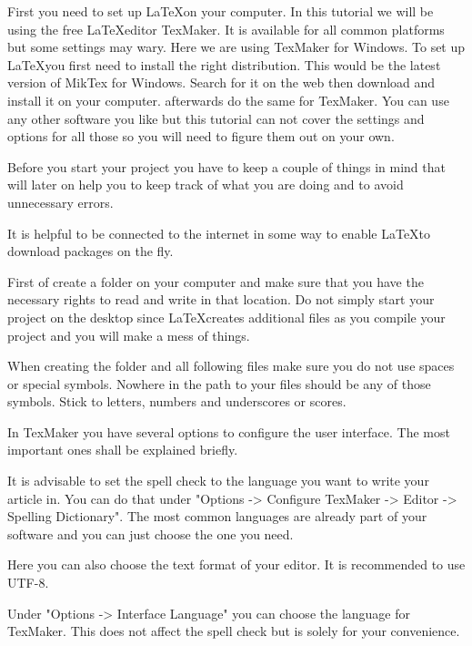 \documentclass[justified]{tufte-book} %
\begin{document}
First you need to set up \LaTeX on your computer. In this tutorial we will be using the free \LaTeX editor TexMaker. It is available for all common platforms but some settings may wary. Here we are using TexMaker for Windows. To set up \LaTeX you first need to install the right distribution. This would be the latest version of MikTex for Windows. Search for it on the web then download and install it on your computer. afterwards do the same for TexMaker. You can use any other software you like but this tutorial can not cover the settings and options for all those so you will need to figure them out on your own.
  
Before you start your project you have to keep a couple of things in mind that will later on help you to keep track of what you are doing and to avoid unnecessary errors.
 
It is helpful to be connected to the internet in some way to enable \LaTeX to download packages on the fly.

First of create a folder on your computer and make sure that you have the necessary rights to read and write in that location. Do not simply start your project on the desktop since \LaTeX creates additional files as you compile your project and you will make a mess of things.
 
When creating the folder and all following files make sure you do not use spaces or special symbols. Nowhere in the path to your files should be any of those symbols. Stick to letters, numbers and underscores or scores. 

In TexMaker you have several options to configure the user interface. The most important ones shall be explained briefly. 

It is advisable to set the spell check to the language you want to write your article in. You can do that under "Options -> Configure TexMaker -> Editor -> Spelling Dictionary". The most common languages are already part of your software and you can just choose the one you need.  

Here you can also choose the text format of your editor. It is recommended to use UTF-8.

Under "Options -> Interface Language" you can choose the language for TexMaker. This does not affect the spell check but is solely for your convenience.  
\end{document}
